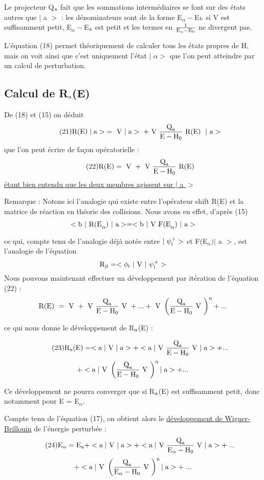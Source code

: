 Le projecteur Q$_{\text{a}}$ fait que les sommations intermédiaires se font sur
des états autres que $|$ a $>$ : les dénominateurs sont de la forme E$_\alpha-$E$_{\text{b}}$ si
V est suffisamment petit, E$_\alpha-$E$_{\text{a}}$ est petit et les termes en 
$\frac{1}{\text{E}_\alpha-\text{E}_{\text{b}}}$ ne
divergent pas.

L'équation (18) permet théoriquement de calculer tous les états propres de H,
mais on voit ainsi que c'est uniquement l'état $|\;\alpha>$ que l'on peut
atteindre par un calcul de perturbation.
\subsection{Calcul de R$_{\text{a}}$(E)}%
De (18) et (15) on déduit
\[
\tag{21}\text{R(E)}\;|\;\text{a}>\;=\text{ V }|\;\text{a}>\;+\text{ V }
\frac{\text{Q}_{\text{a}}}{\text{E}-\text{H}_0}\text{ R(E) }\;|\text{ a}>
\]
que l'on peut écrire de façon opératorielle :
\[
\tag{22}\text{R(E)}=\text{ V }+\text{ V }
\frac{\text{Q}_{\text{a}}}{\text{E}-\text{H}_0}\text{ R(E)}
\]
\ul{étant bien entendu que les deux membres agissent sur $|$ a $>$}

Remarque : Notons ici l'analogie qui existe entre l'opérateur shift R(E) et la
matrice de réaction en théorie des collisions.
Nous avons en effet, d'après (15)
\[
<\text{b }|\text{ R(E}_\alpha)\ |\text{ a}>=<\text{b }|\text{ V F(E}_\alpha)\ |\text{ a}>
\]

ce qui, compte tenu de l'analogie déjà notée entre $|\ \psi_{\text{i}}^+>$ et  F(E$_\alpha)|$ a $>$,
est l'analogie de l'équation
\[
\mt{R}_\mt{ji}=<\phi_\mt{i}\ |\mt{ V }|\ \psi_\mt{i}^+>
\]
Nous pouvons maintenant effectuer un développement par itération de l'équation (22) :
\[
\text{R(E) }=\text{ V }+\text{ V }\frac{\text{Q}_{\text{a}}}{\text{E}-\text{H}_0}\text{ V }+...+
\text{ V }\left(\frac{\text{Q}_{\text{a}}}{\text{E}-\text{H}_0}\text{ V }\right)^{\text{n}}+...
\]

ce qui nous donne le développement de R$_{\text{a}}$(E) :

\[
\tag{23}\text{R}_{\text{a}}(\text{E})=<\text{a}\;|\text{ V }|\;\text{a}>+<\text{a}\;|\text{ V }\frac{\text{Q}_{\text{a}}}{\text{E}-\text{H}_0}\text{ V }|\;\text{a}>+...
\]
\[
+<\text{a}\;|\text{ V }\left(\frac{\text{Q}_{\text{a}}}{\text{E}-\text{H}_0}\text{ V }\right)^{\text{n}}|\;\text{a}>+...
\]

Ce développement ne pourra converger que si R$_{\text{a}}$(E) est suffisamment petit, donc
notamment pour E = E$_\alpha$.

Compte tenu de l'équation (17), on obtient alors le \ul{développement de
Wigner-Brillouin} de l'énergie perturbée :
\[
\tag{24}\text{E}_\alpha=\text{E}_{\text{a}}+<\text{a}\;|\text{ V }|\;\text{a}>+<\text{a}\;|\text{ V }\frac{\text{Q}_{\text{a}}}{\text{E}_\alpha-\text{H}_0}\text{ V }|\;\text{a}>+\;...
\]
\[
+<\text{a}\;|\text{ V }\left(\frac{\text{Q}_{\text{a}}}{\text{E}_\alpha-\text{H}_0}\text{ V }\right)^{\text{n}}|\;\text{a}>+\;...
\]

